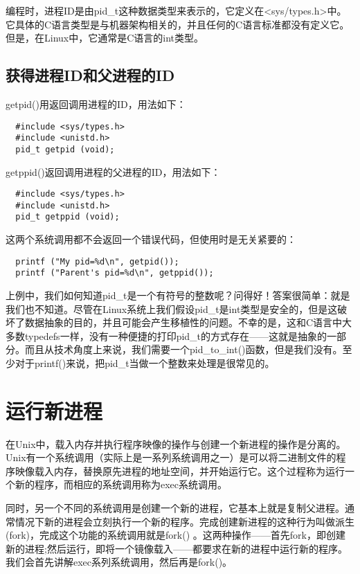 编程时，进程ID是由pid\_t这种数据类型来表示的，它定义在<sys/types.h>中。它具体的C语言类型是与机器架构相关的，并且任何的C语言标准都没有定义它。但是，在Linux中，它通常是C语言的int类型。

\subsection{获得进程ID和父进程的ID}

getpid()用返回调用进程的ID，用法如下：

\begin{lstlisting}
  #include <sys/types.h>
  #include <unistd.h>
  pid_t getpid (void);
\end{lstlisting}

getppid()返回调用进程的父进程的ID，用法如下：

\begin{lstlisting}
  #include <sys/types.h>
  #include <unistd.h>
  pid_t getppid (void);
\end{lstlisting}

这两个系统调用都不会返回一个错误代码，但使用时是无关紧要的：

\begin{lstlisting}
  printf ("My pid=%d\n", getpid());
  printf ("Parent's pid=%d\n", getppid());
\end{lstlisting}

上例中，我们如何知道pid\_t是一个有符号的整数呢？问得好！答案很简单：就是我们也不知道。尽管在Linux系统上我们假设pid\_t是int类型是安全的，但是这破坏了数据抽象的目的，并且可能会产生移植性的问题。不幸的是，这和C语言中大多数typedefs一样，没有一种便捷的打印pid\_t的方式存在——这就是抽象的一部分。而且从技术角度上来说，我们需要一个pid\_to\_int()函数，但是我们没有。至少对于printf()来说，把pid\_t当做一个整数来处理是很常见的。

\section{运行新进程}

在Unix中，载入内存并执行程序映像的操作与创建一个新进程的操作是分离的。Unix有一个系统调用（实际上是一系列系统调用之一）是可以将二进制文件的程序映像载入内存，替换原先进程的地址空间，并开始运行它。这个过程称为运行一个新的程序，而相应的系统调用称为exec系统调用。

同时，另一个不同的系统调用是创建一个新的进程，它基本上就是复制父进程。通常情况下新的进程会立刻执行一个新的程序。完成创建新进程的这种行为叫做派生(fork)，完成这个功能的系统调用就是fork() 。这两种操作——首先fork，即创建新的进程;然后运行，即将一个镜像载入——都要求在新的进程中运行新的程序。我们会首先讲解exec系列系统调用，然后再是fork()。

